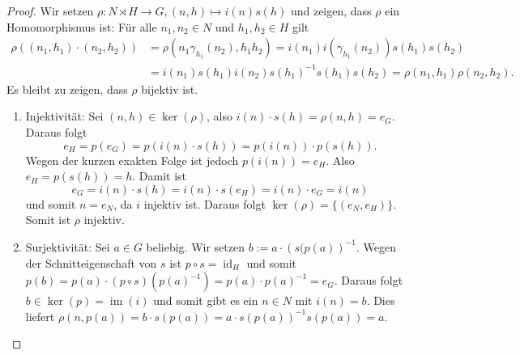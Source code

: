 \documentclass[12pt]{scrartcl} %
\DeclareMathOperator{\id}{id}
\DeclareMathOperator{\im}{im}
\DeclareMathOperator{\Aut}{Aut}
\newcommand{\inv}[1]{\left(#1\right)^{-1}}
\newcommand{\Inv}[1]{#1^{-1}}
\theoremstyle{definition}
\theoremstyle{remark}
\begin{document}
%
%
%

\begin{proof}
	Wir setzen $\rho: N\rtimes H \to G, (n,h)\mapsto i(n)s(h)$ und zeigen, dass $\rho$ ein Homomorphismus ist: Für alle $n_1,n_2 \in N$ und $h_1,h_2 \in H$ gilt
	\begin{align*}
		\rho((n_1,h_1)\cdot (n_2,h_2)) &= \rho(n_1\gamma_{h_1}(n_2), h_1h_2) = i(n_1)i(\gamma_{h_1}(n_2))s(h_1)s(h_2)\\
		&= i(n_1)s(h_1)i(n_2)\Inv{s(h_1)}s(h_1)s(h_2) = \rho(n_1,h_1)\rho(n_2,h_2).
	\end{align*}
	Es bleibt zu zeigen, dass $\rho$ bijektiv ist.
	\begin{enumerate}
	\item Injektivität: Sei $(n,h)\in \ker(\rho)$, also \(i(n)\cdot s(h) = \rho(n, h) = e_G\).
		Daraus folgt \[e_H = p(e_G) = p(i(n)\cdot s(h)) = p(i(n))\cdot p(s(h)).\]
		Wegen der kurzen exakten Folge ist jedoch $p(i(n)) = e_H$.
		Also $e_H = p(s(h)) = h$.
		Damit ist \[e_G = i(n)\cdot s(h) = i(n)\cdot s(e_H) = i(n)\cdot e_G = i(n)\] und somit $n=e_N$, da $i$ injektiv ist.
		Daraus folgt $\ker(\rho) = \{(e_N,e_H)\}$.
		Somit ist $\rho$ injektiv.
	\item Surjektivität: Sei $a\in G$ beliebig.
		Wir setzen $b := a\cdot\inv{s(p(a)}$.
		Wegen der Schnitteigenschaft von $s$ ist $p\circ s = \id_H$ und somit $p(b) = p(a)\cdot (p\circ s)(\Inv{p(a)})=p(a)\cdot\Inv{p(a)}=e_G$.
		Daraus folgt $b\in\ker(p)= \im(i)$ und somit gibt es ein $n\in N$ mit $i(n) = b$.
		Dies liefert $\rho(n,p(a)) = b\cdot s(p(a))=a\cdot s(p(a))^{-1}s(p(a))=a$. \qedhere
	\end{enumerate}
\end{proof}
\end{document}

